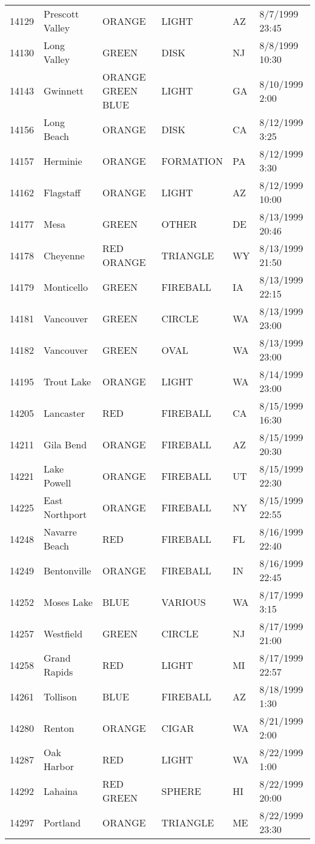 \begin{tabular}{llllll}
14129 & Prescott Valley & ORANGE & LIGHT & AZ & 8/7/1999 23:45 \\
14130 & Long Valley & GREEN & DISK & NJ & 8/8/1999 10:30 \\
14143 & Gwinnett & ORANGE GREEN BLUE & LIGHT & GA & 8/10/1999 2:00 \\
14156 & Long Beach & ORANGE & DISK & CA & 8/12/1999 3:25 \\
14157 & Herminie & ORANGE & FORMATION & PA & 8/12/1999 3:30 \\
14162 & Flagstaff & ORANGE & LIGHT & AZ & 8/12/1999 10:00 \\
14177 & Mesa & GREEN & OTHER & DE & 8/13/1999 20:46 \\
14178 & Cheyenne & RED ORANGE & TRIANGLE & WY & 8/13/1999 21:50 \\
14179 & Monticello & GREEN & FIREBALL & IA & 8/13/1999 22:15 \\
14181 & Vancouver & GREEN & CIRCLE & WA & 8/13/1999 23:00 \\
14182 & Vancouver & GREEN & OVAL & WA & 8/13/1999 23:00 \\
14195 & Trout Lake & ORANGE & LIGHT & WA & 8/14/1999 23:00 \\
14205 & Lancaster & RED & FIREBALL & CA & 8/15/1999 16:30 \\
14211 & Gila Bend & ORANGE & FIREBALL & AZ & 8/15/1999 20:30 \\
14221 & Lake Powell & ORANGE & FIREBALL & UT & 8/15/1999 22:30 \\
14225 & East Northport & ORANGE & FIREBALL & NY & 8/15/1999 22:55 \\
14248 & Navarre Beach & RED & FIREBALL & FL & 8/16/1999 22:40 \\
14249 & Bentonville & ORANGE & FIREBALL & IN & 8/16/1999 22:45 \\
14252 & Moses Lake & BLUE & VARIOUS & WA & 8/17/1999 3:15 \\
14257 & Westfield & GREEN & CIRCLE & NJ & 8/17/1999 21:00 \\
14258 & Grand Rapids & RED & LIGHT & MI & 8/17/1999 22:57 \\
14261 & Tollison & BLUE & FIREBALL & AZ & 8/18/1999 1:30 \\
14280 & Renton & ORANGE & CIGAR & WA & 8/21/1999 2:00 \\
14287 & Oak Harbor & RED & LIGHT & WA & 8/22/1999 1:00 \\
14292 & Lahaina & RED GREEN & SPHERE & HI & 8/22/1999 20:00 \\
14297 & Portland & ORANGE & TRIANGLE & ME & 8/22/1999 23:30 \\

\end{tabular}
